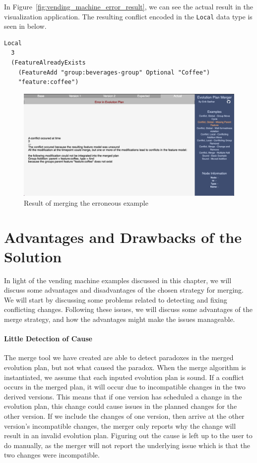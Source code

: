 \documentclass[a4paper,english]{ifimaster}
\begin{document}
In Figure~\vref{fig:vending_machine_error_result}, we can see the actual result in the visualization application. The resulting conflict encoded in the \texttt{Local} data type is seen in below.

\begin{verbatim}
Local 
  3 
  (FeatureAlreadyExists
    (FeatureAdd "group:beverages-group" Optional "Coffee")
    "feature:coffee")
\end{verbatim}

\begin{figure}[htpb]
  \centering
  \includegraphics[width=\linewidth]{vending_machine/error_result.png}
  \caption{Result of merging the erroneous example}%
  \label{fig:vending_machine_error_result}
\end{figure}

\section{Advantages and Drawbacks of the Solution}%
\label{sec:advantages_and_drawbacks_of_the_solution}

In light of the vending machine examples discussed in this chapter, we will discuss some advantages and disadvantages of the chosen strategy for merging. We will start by discussing some problems related to detecting and fixing conflicting changes. Following these issues, we will discuss some advantages of the merge strategy, and how the advantages might make the issues manageable.

\paragraph{Little Detection of Cause}%
\label{par:little_detection_of_cause}

The merge tool we have created are able to detect paradoxes in the merged evolution plan, but not what caused the paradox. When the merge algorithm is instantiated, we assume that each inputed evolution plan is sound. If a conflict occurs in the merged plan, it will occur due to incompatible changes in the two derived versions. This means that if one version has scheduled a change in the evolution plan, this change could cause issues in the planned changes for the other version. If we include the changes of one version, then arrive at the other version's incompatible changes, the merger only reports why the change will result in an invalid evolution plan. Figuring out the cause is left up to the user to do manually, as the merger will not report the underlying issue which is that the two changes were incompatible.
\end{document}
